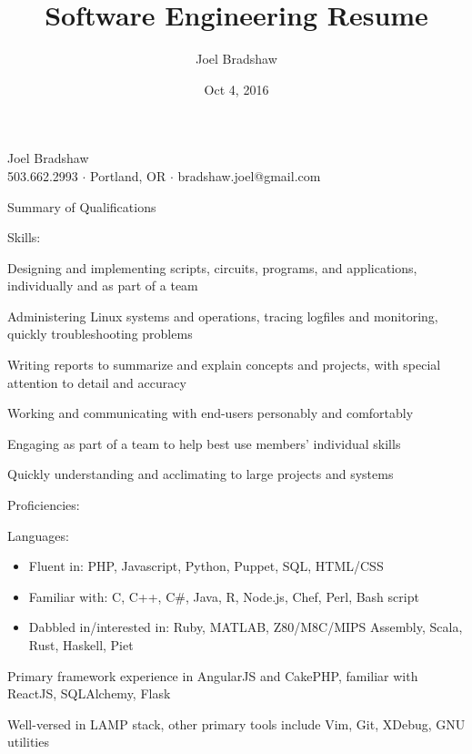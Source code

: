 \documentclass[letterpaper,10pt]{article}
\newenvironment{res_section}[1]{%
  \vskip 6pt
  \noindent
  {\Large \textbf{#1}}\\
  \rule[8pt]{\textwidth}{0.5pt}
  \vskip -8pt
}{
}
\newenvironment{res_subsection}[1]{%
  \vskip 4pt
  \noindent
  \textbf{\large{#1}}
  \begin{itemize}
}{
  \end{itemize}
}
\begin{document}
\title{Software Engineering Resume}
\author{Joel Bradshaw}
\date{Oct 4, 2016}
\begin{center}
{\Huge Joel Bradshaw}\\
\vskip 2pt
{\large 503.662.2993 \ensuremath{\cdot} Portland, OR \ensuremath{\cdot} bradshaw.joel@gmail.com}
\end{center}
\vskip -8pt
\begin{res_section}{Summary of Qualifications}
\begin{res_subsection}{Skills:}
  \item Designing and implementing scripts, circuits, programs, and applications, individually and as part of a team
  \item Administering Linux systems and operations, tracing logfiles and monitoring, quickly troubleshooting problems
  \item Writing reports to summarize and explain concepts and projects, with special attention to detail and accuracy
  \item Working and communicating with end-users personably and comfortably
  \item Engaging as part of a team to help best use members' individual skills
  \item Quickly understanding and acclimating to large projects and systems
\end{res_subsection}
\begin{res_subsection}{Proficiencies:}
  \item Languages:
  \def \multicolsep {0pt}
  \setlength{\columnsep}{-8pt}
  \begin{itemize}
    \item Fluent in: PHP, Javascript, Python, Puppet, SQL, HTML/CSS
    \item Familiar with: C, C++, C\#, Java, R, Node.js, Chef, Perl, Bash script
    \item Dabbled in/interested in: Ruby, MATLAB, Z80/M8C/MIPS Assembly, Scala, Rust, Haskell, Piet
  \end{itemize}
  \item Primary framework experience in AngularJS and CakePHP, familiar with ReactJS, SQLAlchemy, Flask
  \item Well-versed in LAMP stack, other primary tools include Vim, Git, XDebug, GNU utilities
\end{res_subsection}
\end{res_section}
\end{document}
